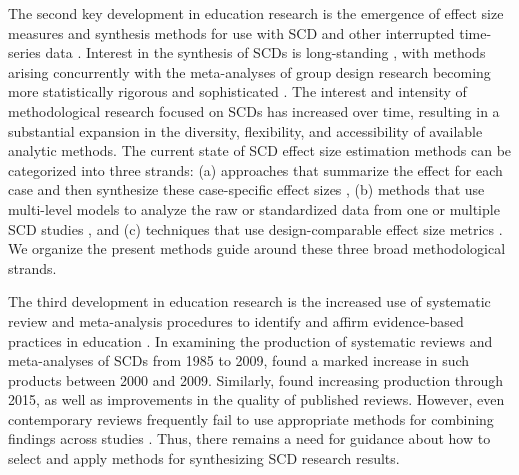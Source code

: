 \documentclass[
]{book}
\begin{document}
The second key development in education research is the emergence of effect size measures and synthesis methods for use with SCD and other interrupted time-series data \citep{shadish2015Role, Swaminathan2014effect}.
Interest in the synthesis of SCDs is long-standing \citep[e.g.,][]{Center1985methodology, Gingerich1984meta, White1987some}, with methods arising concurrently with the meta-analyses of group design research becoming more statistically rigorous and sophisticated \citep{hedges1985statistical, shadish2015metaanalytic}.
The interest and intensity of methodological research focused on SCDs has increased over time, resulting in a substantial expansion in the diversity, flexibility, and accessibility of available analytic methods.
The current state of SCD effect size estimation methods can be categorized into three strands:
(a) approaches that summarize the effect for each case and then synthesize these case-specific effect sizes \citep[e.g.,][]{pustejovsky2018Using},
(b) methods that use multi-level models to analyze the raw or standardized data from one or multiple SCD studies \citep{VandenNoortgate2008multilevel}, and
(c) techniques that use design-comparable effect size metrics \citep{Hedges2012ABk, Hedges2012MB, Pustejovsky2014design, Shadish2013d, Swaminathan2014effect}.
We organize the present methods guide around these three broad methodological strands.

The third development in education research is the increased use of systematic review and meta-analysis procedures to identify and affirm evidence-based practices in education \citep{Beretvas2008review, Shadish2007methods}.
In examining the production of systematic reviews and meta-analyses of SCDs from 1985 to 2009, \citet{maggin2011Quantitative} found a marked increase in such products between 2000 and 2009.
Similarly, \citet{jamshidi2018Methodological} found increasing production through 2015, as well as improvements in the quality of published reviews.
However, even contemporary reviews frequently fail to use appropriate methods for combining findings across studies \citep{jamshidi2018Methodological}.
Thus, there remains a need for guidance about how to select and apply methods for synthesizing SCD research results.
\end{document}

